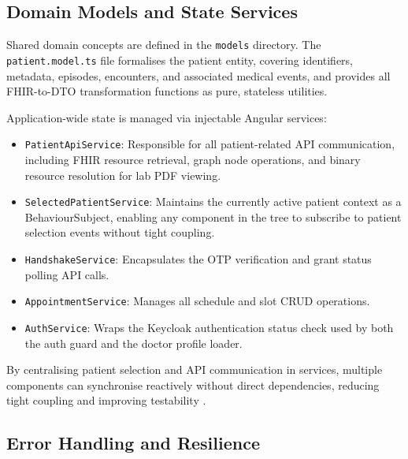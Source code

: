 \subsection{Domain Models and State Services}
\label{subsec:state-management}

Shared domain concepts are defined in the \texttt{models} directory. The
\texttt{patient.model.ts} file formalises the patient entity, covering
identifiers, metadata, episodes, encounters, and associated medical events,
and provides all FHIR-to-DTO transformation functions as pure, stateless
utilities.

Application-wide state is managed via injectable Angular services:

\begin{itemize}
    \item \texttt{PatientApiService}: Responsible for all patient-related API
          communication, including FHIR resource retrieval, graph node
          operations, and binary resource resolution for lab PDF viewing.
    \item \texttt{SelectedPatientService}: Maintains the currently active
          patient context as a BehaviourSubject, enabling any component in the
          tree to subscribe to patient selection events without tight coupling.
    \item \texttt{HandshakeService}: Encapsulates the OTP verification and
          grant status polling API calls.
    \item \texttt{AppointmentService}: Manages all schedule and slot CRUD
          operations.
    \item \texttt{AuthService}: Wraps the Keycloak authentication status check
          used by both the auth guard and the doctor profile loader.
\end{itemize}

By centralising patient selection and API communication in services, multiple
components can synchronise reactively without direct dependencies, reducing
tight coupling and improving testability \cite{angularDocs}.

\subsection{Error Handling and Resilience}

